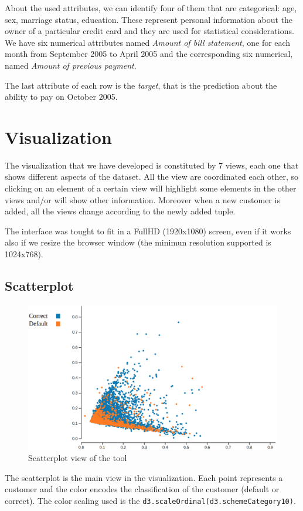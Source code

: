 \documentclass[journal]{vgtc}                %
\begin{document}
About the used attributes, we can identify four of them that are categorical: age, sex, marriage status, education. These represent personal information about the owner of a particular credit card and they are used for statistical considerations. We have six numerical attributes named \textit{Amount of bill statement}, one for each month from September 2005 to April 2005 and the corresponding six numerical, named \textit{Amount of previous payment}.

The last attribute of each row is the \textit{target}, that is the prediction about the ability to pay on October 2005.


\section{Visualization}
The visualization that we have developed is constituted by 7 views, each one that shows different aspects of the dataset. All the view are coordinated each other, so clicking on
an element of a certain view will highlight some elements in the other views and/or will show other information. Moreover when a new customer is added, all the views change according to
the newly added tuple.

The interface was tought to fit in a FullHD (1920x1080) screen, even if it works also if we resize the browser window (the minimun resolution supported is 1024x768).


\subsection{Scatterplot}

\begin{figure}[h]
  \includegraphics[scale=0.15]{scatterplot}
  \caption{Scatterplot view of the tool}
  \label{scatterplot}
\end{figure}
The scatterplot is the main view in the visualization. Each point represents a customer and the color encodes the classification of the customer (default or correct). The color scaling used is the \texttt{d3.scaleOrdinal(d3.schemeCategory10)}.
\end{document}
